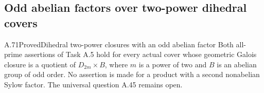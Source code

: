 \subsection{Odd abelian factors over two-power dihedral covers}

\begin{statement}{A.71}{Proved}{Dihedral two-power closures with an odd abelian factor}
Both all-prime
assertions of Task A.5 hold for every actual cover whose geometric
Galois closure is a quotient of
\(D_{2m}\times B\), where \(m\) is a power of two and \(B\)
is an abelian group of odd order. No assertion is made for a
product with a second nonabelian Sylow factor. The universal
question A.45 remains open.
\end{statement}

